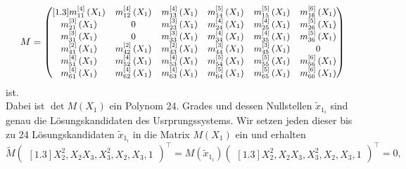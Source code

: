 \documentclass[a4paper,oneside, 11pt, openany%
]{article}
\theoremstyle{custom}
\theoremstyle{custom}
\begin{document}
\begin{equation}
	\small
	M = \begin{pmatrix}[1.3]
		m_{11}^{\left[ 4\right]}\left( X_{1}\right) & m_{12}^{\left[ 4\right]}\left( X_{1}\right) & m_{13}^{\left[ 4\right]}\left( X_{1}\right) & m_{14}^{\left[ 5\right]}\left( X_{1}\right) & m_{15}^{\left[ 5\right]}\left( X_{1}\right) & m_{16}^{\left[ 6\right]}\left( X_{1}\right)\\
		m_{21}^{\left[ 3\right]}\left( X_{1}\right) & 0 & m_{23}^{\left[ 3\right]}\left( X_{1}\right)& m_{24}^{\left[ 4\right]}\left( X_{1}\right) & m_{25}^{\left[ 4\right]}\left( X_{1}\right)& m_{26}^{\left[ 5\right]}\left( X_{1}\right) \\
		m_{31}^{\left[ 3\right]}\left( X_{1}\right) & 0 & m_{33}^{\left[ 3\right]}\left( X_{1}\right)& m_{34}^{\left[ 4\right]}\left( X_{1}\right) & m_{35}^{\left[ 4\right]}\left( X_{1}\right)& m_{36}^{\left[ 5\right]}\left( X_{1}\right) \\
		m_{41}^{\left[ 2\right]}\left( X_{1}\right) & m_{42}^{\left[ 2\right]}\left( X_{1}\right) & m_{43}^{\left[ 2\right]}\left( X_{1}\right)& m_{44}^{\left[ 3\right]}\left( X_{1}\right) & m_{45}^{\left[ 3\right]}\left( X_{1}\right)& 0 \\
		m_{51}^{\left[ 4\right]}\left( X_{1}\right) & m_{52}^{\left[ 4\right]}\left( X_{1}\right) & m_{53}^{\left[ 4\right]}\left( X_{1}\right) & m_{54}^{\left[ 5\right]}\left( X_{1}\right) & m_{55}^{\left[ 5\right]}\left( X_{1}\right) & m_{56}^{\left[ 6\right]}\left( X_{1}\right)\\
		m_{61}^{\left[ 4\right]}\left( X_{1}\right) & m_{62}^{\left[ 4\right]}\left( X_{1}\right) & m_{63}^{\left[ 4\right]}\left( X_{1}\right) & m_{64}^{\left[ 5\right]}\left( X_{1}\right) & m_{65}^{\left[ 5\right]}\left( X_{1}\right) & m_{66}^{\left[ 6\right]}\left( X_{1}\right)\\
	\end{pmatrix}
\end{equation}
ist.\\
Dabei ist $\det{M(X_{1})}$ ein Polynom 24. Grades und dessen Nullstellen $\tilde{x}_{1_{i}}$ sind genau die Lösungskandidaten des Usrprungssystems.
Wir setzen jeden dieser bis zu 24 Lösungskandidaten $\tilde{x}_{1_{i}}$ in die Matrix $M(X_{1})$ ein und erhalten 
\begin{equation}\label{eqn:low_rank_system_4C3}
	\tilde{M}\begin{pmatrix}[1.3]
		X_{2}^2,
		X_{2}X_{3},
		X_{3}^2,
		X_{2},
		X_{3},
		1
	\end{pmatrix}^{\top} = 	M(\tilde{x}_{1_{i}})\begin{pmatrix}[1.3]
		X_{2}^2,
		X_{2}X_{3},
		X_{3}^2,
		X_{2},
		X_{3},
		1
	\end{pmatrix}^{\top}=0,
\end{equation}
\end{document}
